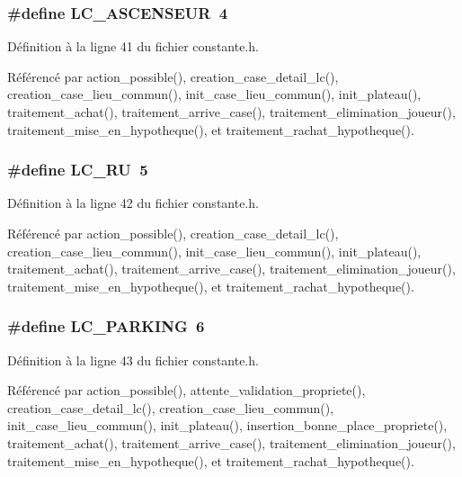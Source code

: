 \subsubsection{\setlength{\rightskip}{0pt plus 5cm}\#define LC\_\-ASCENSEUR~4}\label{constante_8h_fffd46a61b11e88ee78aadff949e1f4d}




D\'{e}finition \`{a} la ligne 41 du fichier constante.h.

R\'{e}f\'{e}renc\'{e} par action\_\-possible(), creation\_\-case\_\-detail\_\-lc(), creation\_\-case\_\-lieu\_\-commun(), init\_\-case\_\-lieu\_\-commun(), init\_\-plateau(), traitement\_\-achat(), traitement\_\-arrive\_\-case(), traitement\_\-elimination\_\-joueur(), traitement\_\-mise\_\-en\_\-hypotheque(), et traitement\_\-rachat\_\-hypotheque().
\subsubsection{\setlength{\rightskip}{0pt plus 5cm}\#define LC\_\-RU~5}\label{constante_8h_9b30d8e1e34829a936da477e94b5e376}




D\'{e}finition \`{a} la ligne 42 du fichier constante.h.

R\'{e}f\'{e}renc\'{e} par action\_\-possible(), creation\_\-case\_\-detail\_\-lc(), creation\_\-case\_\-lieu\_\-commun(), init\_\-case\_\-lieu\_\-commun(), init\_\-plateau(), traitement\_\-achat(), traitement\_\-arrive\_\-case(), traitement\_\-elimination\_\-joueur(), traitement\_\-mise\_\-en\_\-hypotheque(), et traitement\_\-rachat\_\-hypotheque().
\subsubsection{\setlength{\rightskip}{0pt plus 5cm}\#define LC\_\-PARKING~6}\label{constante_8h_a55f3cedf3fd4b2510c1bb0b805facbf}




D\'{e}finition \`{a} la ligne 43 du fichier constante.h.

R\'{e}f\'{e}renc\'{e} par action\_\-possible(), attente\_\-validation\_\-propriete(), creation\_\-case\_\-detail\_\-lc(), creation\_\-case\_\-lieu\_\-commun(), init\_\-case\_\-lieu\_\-commun(), init\_\-plateau(), insertion\_\-bonne\_\-place\_\-propriete(), traitement\_\-achat(), traitement\_\-arrive\_\-case(), traitement\_\-elimination\_\-joueur(), traitement\_\-mise\_\-en\_\-hypotheque(), et traitement\_\-rachat\_\-hypotheque().
